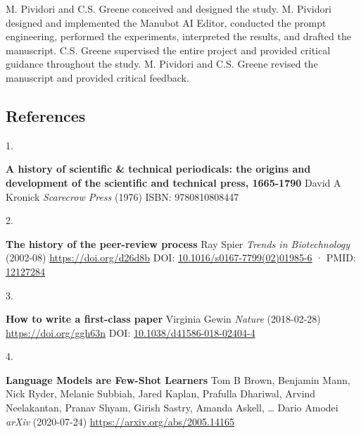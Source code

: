 \documentclass[
]{article}
\newlength{\cslhangindent}
\newlength{\csllabelwidth}
\newlength{\cslentryspacingunit} %
\newenvironment{CSLReferences}[2] %
 {%
  \setlength{\parindent}{0pt}
  \ifodd #1
  \let\oldpar\par
  \def\par{\hangindent=\cslhangindent\oldpar}
  \fi
  \setlength{\parskip}{#2\cslentryspacingunit}
 }%
 {}
\newcommand{\CSLBlock}[1]{#1\hfill\break}
\newcommand{\CSLLeftMargin}[1]{\parbox[t]{\csllabelwidth}{#1}}
\newcommand{\CSLRightInline}[1]{\parbox[t]{\linewidth - \csllabelwidth}{#1}\break}
\providecommand{\DIFaddbegin}{} %
\providecommand{\DIFaddend}{} %
\providecommand{\DIFdelbegin}{} %
\providecommand{\DIFdelend}{} %
\newcommand{\DIFscaledelfig}{0.5}
\newlength{\DIFdelgraphicswidth} %
\newlength{\DIFdelgraphicsheight} %
\newcommand{\DIFaddincludegraphics}[2][]{{\color{blue}\fbox{\DIFOincludegraphics[#1]{#2}}}} %
\newcommand{\DIFdelincludegraphics}[2][]{%
\sbox{\DIFdelgraphicsbox}{\DIFOincludegraphics[#1]{#2}}%
\settoboxwidth{\DIFdelgraphicswidth}{\DIFdelgraphicsbox} %
\settoboxtotalheight{\DIFdelgraphicsheight}{\DIFdelgraphicsbox} %
\scalebox{\DIFscaledelfig}{%
\parbox[b]{\DIFdelgraphicswidth}{\usebox{\DIFdelgraphicsbox}\\[-\baselineskip] \rule{\DIFdelgraphicswidth}{0em}}\llap{\resizebox{\DIFdelgraphicswidth}{\DIFdelgraphicsheight}{%
\setlength{\unitlength}{\DIFdelgraphicswidth}%
\begin{picture}(1,1)%
\thicklines\linethickness{2pt} %
{\color[rgb]{1,0,0}\put(0,0){\framebox(1,1){}}}%
{\color[rgb]{1,0,0}\put(0,0){\line( 1,1){1}}}%
{\color[rgb]{1,0,0}\put(0,1){\line(1,-1){1}}}%
\end{picture}%
}\hspace*{3pt}}} %
} %
\DeclareRobustCommand{\DIFaddbegin}{\DIFOaddbegin \let\includegraphics\DIFaddincludegraphics} %
\DeclareRobustCommand{\DIFaddend}{\DIFOaddend \let\includegraphics\DIFOincludegraphics} %
\DeclareRobustCommand{\DIFdelbegin}{\DIFOdelbegin \let\includegraphics\DIFdelincludegraphics} %
\DeclareRobustCommand{\DIFdelend}{\DIFOaddend \let\includegraphics\DIFOincludegraphics} %
\begin{document}
M. Pividori and C.S. Greene conceived and designed the study.
M. Pividori designed and implemented the Manubot AI Editor, conducted the prompt engineering, performed the experiments, interpreted the results, and drafted the manuscript.
C.S. Greene supervised the entire project and provided critical guidance throughout the study.
M. Pividori and C.S. Greene revised the manuscript and provided critical feedback.

\subsection{References}

\hypertarget{refs}{}
\begin{CSLReferences}{0}{0}
\leavevmode{}%
\CSLLeftMargin{1. }%
\CSLRightInline{\textbf{A history of scientific \& technical periodicals: the origins and development of the scientific and technical press, 1665-1790}
\CSLBlock{David A Kronick} \emph{Scarecrow Press} (1976)
\CSLBlock{ISBN: 9780810808447}}

\leavevmode{}%
\CSLLeftMargin{2. }%
\CSLRightInline{\textbf{The history of the peer-review process}
\CSLBlock{Ray Spier} \emph{Trends in Biotechnology} (2002-08) \url{https://doi.org/d26d8b}
\CSLBlock{DOI: \href{https://doi.org/10.1016/s0167-7799(02)01985-6}{10.1016/s0167-7799(02)01985-6} · PMID: \href{https://www.ncbi.nlm.nih.gov/pubmed/12127284}{12127284}}}

\leavevmode{}%
\CSLLeftMargin{3. }%
\CSLRightInline{\textbf{How to write a first-class paper}
\CSLBlock{Virginia Gewin} \emph{Nature} (2018-02-28) \url{https://doi.org/ggh63n}
\CSLBlock{DOI: \href{https://doi.org/10.1038/d41586-018-02404-4}{10.1038/d41586-018-02404-4}}}

\leavevmode\vadjust pre{\DIFdelbegin %
\DIFdelend \DIFaddbegin \hypertarget{ref-bYOaJHMe}{}\DIFaddend }%
\CSLLeftMargin{4. }%
\DIFdelbegin %
\DIFdelend \DIFaddbegin \CSLRightInline{\textbf{Language Models are Few-Shot Learners}
\CSLBlock{Tom B Brown, Benjamin Mann, Nick Ryder, Melanie Subbiah, Jared Kaplan, Prafulla Dhariwal, Arvind Neelakantan, Pranav Shyam, Girish Sastry, Amanda Askell, \ldots{} Dario Amodei} \emph{arXiv} (2020-07-24) \url{https://arxiv.org/abs/2005.14165}}
\DIFaddend 


\end{CSLReferences}
\end{document}
